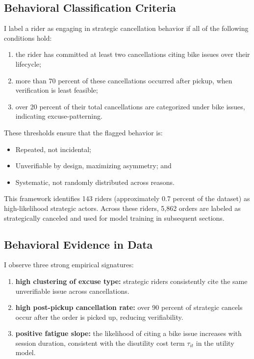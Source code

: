 \subsection{Behavioral Classification Criteria}

I label a rider as engaging in strategic cancellation behavior if all of the following conditions hold:

\begin{enumerate}
    \item the rider has committed at least two cancellations citing bike issues over their lifecycle;
    \item more than 70 percent of these cancellations occurred after pickup, when verification is least feasible;
    \item over 20 percent of their total cancellations are categorized under bike issues, indicating excuse-patterning.
\end{enumerate}

These thresholds ensure that the flagged behavior is:

\begin{itemize}
    \item Repeated, not incidental;
    \item Unverifiable by design, maximizing asymmetry; and
    \item Systematic, not randomly distributed across reasons.
\end{itemize}

This framework identifies 143 riders (approximately 0.7 percent of the dataset) as high-likelihood strategic actors. Across these riders, 5,862 orders are labeled as strategically canceled and used for model training in subsequent sections.

\subsection{Behavioral Evidence in Data}

I observe three strong empirical signatures:

\begin{enumerate}
    \item \textbf{high clustering of excuse type:} strategic riders consistently cite the same unverifiable issue across cancellations.
    \item \textbf{high post-pickup cancellation rate:} over 90 percent of strategic cancels occur after the order is picked up, reducing verifiability.
    \item \textbf{positive fatigue slope:} the likelihood of citing a bike issue increases with session duration, consistent with the disutility cost term $\tau_{it}$ in the utility model.
\end{enumerate}

